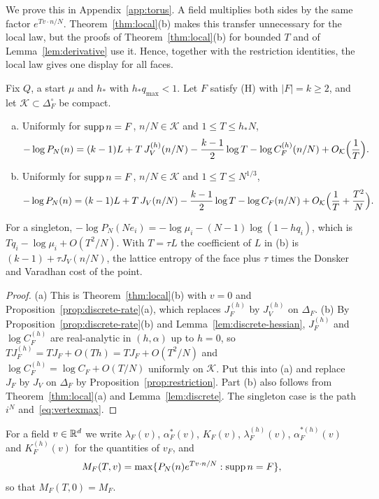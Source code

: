 We prove this in Appendix~\ref{app:torus}. A field
multiplies both sides by the same factor $e^{Tv\cdot n/N}$. Theorem~\ref{thm:local}(b)
makes this transfer unnecessary for the local law, but the proofs of
Theorem~\ref{thm:local}(b) for bounded $T$ and of Lemma~\ref{lem:derivative} use it.
Hence, together with the restriction identities, the local law gives one display for all
faces.

\begin{theorem}\label{thm:stratified}
Fix $Q$, a start $\mu$ and $h_*$ with $h_*q_{\max}<1$. Let $F$ satisfy \textup{(H)} with
$|F|=k\ge2$, and let $\mathcal K\subset\Delta_F^\circ$ be compact.
\begin{enumerate}[(a)]
\item Uniformly for $\operatorname{supp} n=F$, $n/N\in\mathcal K$ and $1\le T\le h_*N$,
\[
 -\log P_N(n)=(k-1)L+T\,J^{(h)}_V(n/N)-\frac{k-1}2\log T-\log C^{(h)}_F(n/N)
 +O_{\mathcal K}\Bigl(\frac1T\Bigr).
\]
\item Uniformly for $\operatorname{supp} n=F$, $n/N\in\mathcal K$ and $1\le T\le N^{1/3}$,
\[
 -\log P_N(n)=(k-1)L+T\,J_V(n/N)-\frac{k-1}2\log T-\log C_F(n/N)+O_{\mathcal K}\Bigl(\frac1T+\frac{T^2}N\Bigr).
\]
\end{enumerate}
For a singleton, $-\log P_N(Ne_i)=-\log\mu_i-(N-1)\log(1-hq_i)$, which is
$Tq_i-\log\mu_i+O(T^2/N)$. With $T=\tau L$ the coefficient of $L$ in (b) is
$(k-1)+\tau J_V(n/N)$, the lattice entropy of the face plus $\tau$ times the
Donsker and Varadhan cost of the point.
\end{theorem}

\begin{proof}
(a) This is Theorem~\ref{thm:local}(b) with $v=0$ and
Proposition~\ref{prop:discrete-rate}(a), which replaces $J^{(h)}_F$ by $J^{(h)}_V$
on $\Delta_F$. (b) By Proposition~\ref{prop:discrete-rate}(b) and
Lemma~\ref{lem:discrete-hessian}, $J^{(h)}_F$ and $\log C^{(h)}_F$ are
real-analytic in $(h,\alpha)$ up to $h=0$, so
$TJ^{(h)}_F=TJ_F+O(Th)=TJ_F+O(T^2/N)$ and $\log C^{(h)}_F=\log C_F+O(T/N)$
uniformly on $\mathcal K$. Put this into (a) and replace $J_F$ by $J_V$ on
$\Delta_F$ by Proposition~\ref{prop:restriction}. Part (b) also follows from
Theorem~\ref{thm:local}(a) and Lemma~\ref{lem:discrete}. The singleton case is the
path $i^N$ and~\eqref{eq:vertexmax}.
\end{proof}

For a field $v\in\mathbb{R}^d$ we write $\lambda_F(v)$, $\alpha^*_F(v)$, $K_F(v)$,
$\lambda^{(h)}_F(v)$, $\alpha^{*(h)}_F(v)$ and $K^{(h)}_F(v)$ for the quantities of
$v_F$, and
\[
M_F(T,v)=\max\{P_N(n)e^{Tv\cdot n/N}:\operatorname{supp} n=F\},
\]
so that $M_F(T,0)=M_F$.

